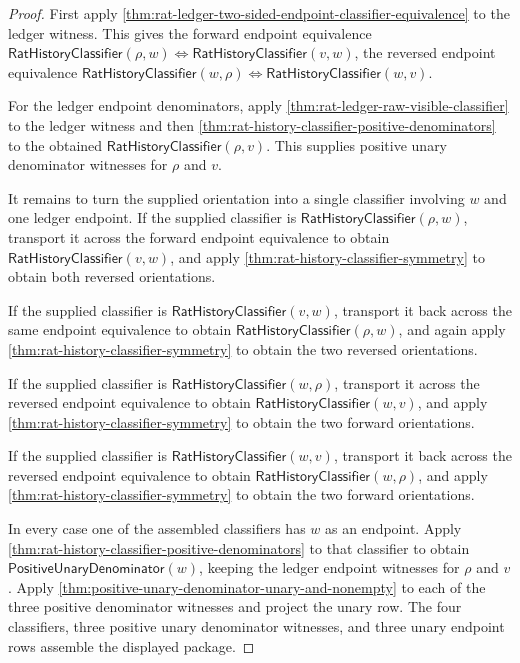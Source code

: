 \begin{proof}
First apply
\autoref{thm:rat-ledger-two-sided-endpoint-classifier-equivalence} to the
ledger witness. This gives the forward endpoint equivalence
$\mathsf{RatHistoryClassifier}(\rho,w)\Longleftrightarrow
\mathsf{RatHistoryClassifier}(v,w)$, the reversed endpoint equivalence
$\mathsf{RatHistoryClassifier}(w,\rho)\Longleftrightarrow
\mathsf{RatHistoryClassifier}(w,v)$.

For the ledger endpoint denominators, apply
\autoref{thm:rat-ledger-raw-visible-classifier} to the ledger witness and then
\autoref{thm:rat-history-classifier-positive-denominators} to the obtained
$\mathsf{RatHistoryClassifier}(\rho,v)$. This supplies positive unary
denominator witnesses for $\rho$ and $v$.

It remains to turn the supplied orientation into a single classifier involving
$w$ and one ledger endpoint. If the supplied classifier is
$\mathsf{RatHistoryClassifier}(\rho,w)$, transport it across the forward
endpoint equivalence to obtain $\mathsf{RatHistoryClassifier}(v,w)$, and apply
\autoref{thm:rat-history-classifier-symmetry} to obtain both reversed
orientations.

If the supplied classifier is $\mathsf{RatHistoryClassifier}(v,w)$, transport
it back across the same endpoint equivalence to obtain
$\mathsf{RatHistoryClassifier}(\rho,w)$, and again apply
\autoref{thm:rat-history-classifier-symmetry} to obtain the two reversed
orientations.

If the supplied classifier is $\mathsf{RatHistoryClassifier}(w,\rho)$,
transport it across the reversed endpoint equivalence to obtain
$\mathsf{RatHistoryClassifier}(w,v)$, and apply
\autoref{thm:rat-history-classifier-symmetry} to obtain the two forward
orientations.

If the supplied classifier is $\mathsf{RatHistoryClassifier}(w,v)$, transport
it back across the reversed endpoint equivalence to obtain
$\mathsf{RatHistoryClassifier}(w,\rho)$, and apply
\autoref{thm:rat-history-classifier-symmetry} to obtain the two forward
orientations.

In every case one of the assembled classifiers has $w$ as an endpoint. Apply
\autoref{thm:rat-history-classifier-positive-denominators} to that classifier
to obtain $\mathsf{PositiveUnaryDenominator}(w)$, keeping the ledger endpoint
witnesses for $\rho$ and $v$. Apply
\autoref{thm:positive-unary-denominator-unary-and-nonempty} to each of the
three positive denominator witnesses and project the unary row. The four
classifiers, three positive unary denominator witnesses, and three unary
endpoint rows assemble the displayed package.
\end{proof}

